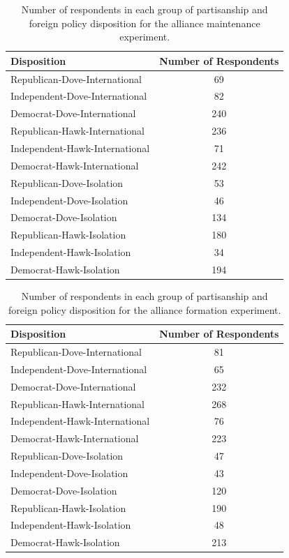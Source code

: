 \documentclass[12pt]{article}
\begin{document}
\begin{table}[htbp]
\centering
\begin{tabular}{lc}
  \hline
 Disposition  & Number of Respondents \\ 
  \hline
Republican-Dove-International &  69 \\ 
  Independent-Dove-International &  82 \\ 
  Democrat-Dove-International & 240 \\ 
  Republican-Hawk-International & 236 \\ 
  Independent-Hawk-International &  71 \\ 
  Democrat-Hawk-International & 242 \\ 
  Republican-Dove-Isolation &  53 \\ 
  Independent-Dove-Isolation &  46 \\ 
  Democrat-Dove-Isolation & 134 \\ 
  Republican-Hawk-Isolation & 180 \\ 
  Independent-Hawk-Isolation &  34 \\ 
  Democrat-Hawk-Isolation & 194 \\ 
   \hline
\end{tabular}
\caption{Number of respondents in each group of partisanship and foreign policy disposition for the alliance maintenance experiment.} 
\label{tab:party-dispo-main}
\end{table}


\begin{table}[htbp]
\centering
\begin{tabular}{lc}
  \hline
 Disposition  & Number of Respondents \\ 
  \hline
Republican-Dove-International &  81 \\ 
  Independent-Dove-International &  65 \\ 
  Democrat-Dove-International & 232 \\ 
  Republican-Hawk-International & 268 \\ 
  Independent-Hawk-International &  76 \\ 
  Democrat-Hawk-International & 223 \\ 
  Republican-Dove-Isolation &  47 \\ 
  Independent-Dove-Isolation &  43 \\ 
  Democrat-Dove-Isolation & 120 \\ 
  Republican-Hawk-Isolation & 190 \\ 
  Independent-Hawk-Isolation &  48 \\ 
  Democrat-Hawk-Isolation & 213 \\ 
   \hline
\end{tabular}
\caption{Number of respondents in each group of partisanship 
               and foreign policy disposition for the alliance formation experiment.} 
\label{tab:party-dispo-form}
\end{table}
\end{document}
